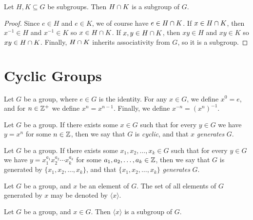 \begin{thm}
    Let $H, K \subseteq G$ be subgroups. Then $H \cap K$ is a subgroup of $G$.
\end{thm}

\begin{proof}
    Since $e \in H$ and $e \in K$, we of course have $e \in H \cap K$. If $x \in H \cap K$, then $x^{-1} \in H$ and $x^{-1} \in K$ so $x \in H \cap K$. If $x, y \in H \cap K$, then $xy \in H$ and $xy \in K$ so $xy \in H \cap K$. Finally, $H \cap K$ inherits associativity from $G$, so it is a subgroup.
\end{proof}

\section{Cyclic Groups}

\begin{defn}
    Let $G$ be a group, where $e \in G$ is the identity. For any $x \in G$, we define $x^0 = e$, and for $n \in \mathbb{Z}^+$ we define $x^n = x^{n-1}$. Finally, we define $x^{-n} = \left(x^n\right)^{-1}$.
\end{defn}

\begin{defn}
    Let $G$ be a group. If there exists some $x \in G$ such that for every $y \in G$ we have $y = x^n$ for some $n \in \mathbb{Z}$, then we say that $G$ is \emph{cyclic}, and that $x$ \emph{generates} $G$.
\end{defn}

\begin{defn}
    Let $G$ be a group. If there exists some $x_1, x_2, \ldots, x_k \in G$ such that for every $y \in G$ we have $y = x_1^{a_1}x_2^{a_2}{\cdots}x_k^{a_k}$ for some $a_1, a_2, \ldots, a_k \in \mathbb{Z}$, then we say that $G$ is generated by $\{x_1, x_2, \ldots, x_k\}$, and that $\{x_1, x_2, \ldots, x_k\}$ \emph{generates} $G$.
\end{defn}

\begin{defn}
    Let $G$ be a group, and $x$ be an element of $G$. The set of all elements of $G$ generated by $x$ may be denoted by $\langle{x}\rangle$.
\end{defn}

\begin{prop}
    Let $G$ be a group, and $x \in G$. Then $\langle{x}\rangle$ is a subgroup of $G$.
\end{prop}

